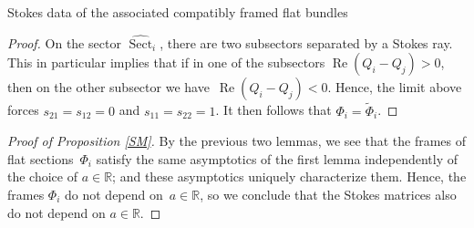 \begin{subsubsection}{Stokes data of the associated compatibly framed flat bundles}
\begin{proof}
On the sector $\widehat{\operatorname{Sect}}_i$, there are two subsectors separated by a Stokes ray. This in particular implies that if in one of the subsectors $\operatorname{Re}(Q_i-Q_j)>0$, then on the other subsector we have~${\operatorname{Re}(Q_i-Q_j)<0}$. Hence, the limit above forces $s_{21}=s_{12}=0$ and $s_{11}=s_{22}=1$. It then follows that $\Phi_i=\widetilde{\Phi}_i$.
\end{proof}

\begin{proof}[Proof of Proposition \ref{SM}] By the previous two lemmas, we see that the frames of flat sections~$\Phi_i$ satisfy the same asymptotics of the first lemma independently of the choice of $a\in \mathbb{R}$; and these asymptotics uniquely characterize them. Hence, the frames $\Phi_i$ do not depend on~${a \in \mathbb{R}}$, so we conclude that the Stokes matrices also do not depend on $a\in \mathbb{R}$.
\end{proof}
\end{subsubsection}
